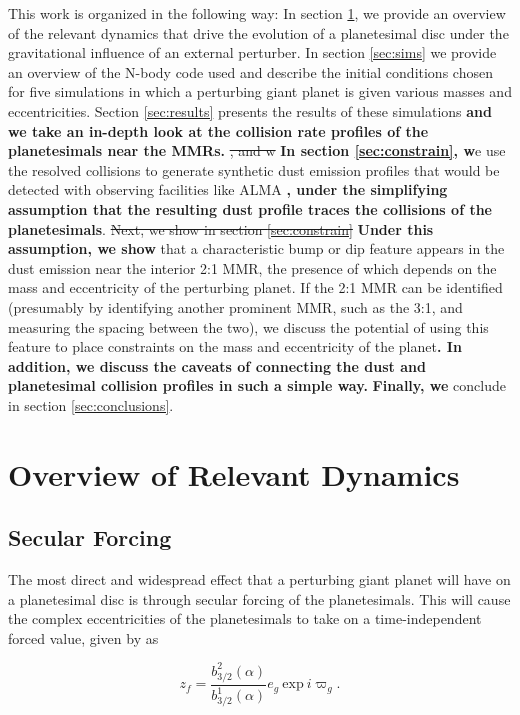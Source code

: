 \documentclass[fleqn,usenatbib]{mnras}
\begin{document}
This work is organized in the following way: In section \ref{sec:dynamics}, we provide an overview of the relevant dynamics that drive the evolution 
of a planetesimal disc under the gravitational influence of an external perturber. In section \ref{sec:sims} we provide an overview of the N-body code 
used and describe the initial conditions chosen for five simulations in which a perturbing giant planet is given various masses 
and eccentricities. Section \ref{sec:results} presents the results of these simulations \textbf{and we take an in-depth look at the collision rate profiles of the planetesimals near the MMRs.} \sout{, and w} \textbf{In section \ref{sec:constrain}, w}e use the resolved collisions to generate synthetic dust 
emission profiles that would be detected with observing facilities like ALMA \textbf{, under the simplifying assumption that the resulting dust profile traces the collisions of the planetesimals}. \sout{Next, we show in section \ref{sec:constrain}} \textbf{Under this assumption, we show} that a characteristic bump 
or dip feature appears in the dust emission near the interior 2:1 MMR, the presence of which depends on the mass and eccentricity of the perturbing 
planet. If the 2:1 MMR can be identified (presumably by identifying another prominent MMR, such as the 3:1, and measuring the spacing between the two), we discuss the potential of using this feature to place constraints on the mass and eccentricity of the planet\textbf{. In addition, we discuss the caveats of connecting the dust and planetesimal collision profiles in such a simple way.} \textbf{Finally, we} conclude in section 
\ref{sec:conclusions}.

\section{Overview of Relevant Dynamics} \label{sec:dynamics}

\subsection{Secular Forcing}\label{sec:sec_force}

The most direct and widespread effect that a perturbing giant planet will have on a planetesimal disc is through secular forcing of the planetesimals. This will 
cause the complex eccentricities of the planetesimals to take on a time-independent 
forced value, given by \citep{1999ApJ...527..918W} as

\begin{equation}\label{eq:eforced}
	z_{f} = \frac{b^{2}_{3/2} (\alpha)}{b^{1}_{3/2} (\alpha)} e_{g} ~ \mathrm{exp} ~ i \varpi_{g}.
\end{equation}
\end{document}
